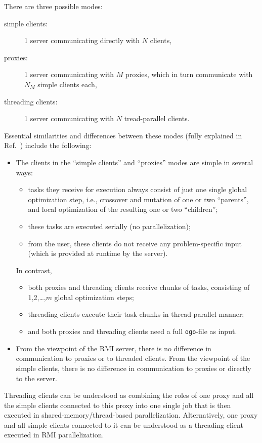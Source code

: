 \documentclass[a4paper,10pt]{scrbook}
\begin{document}
There are three possible modes: 
\begin{description}
\item[simple clients:] 1 server communicating directly with $N$ clients,
\item[proxies:] 1 server communicating with $M$ proxies, which in turn
  communicate with $N_M$ simple clients each,
\item[threading clients:] 1 server communicating with $N$ tread-parallel
  clients. 
\end{description}
Essential similarities and differences between these modes (fully explained in
Ref.~) include the following:
\begin{itemize}
\item The clients in the ``simple clients'' and ``proxies'' modes are simple
  in several ways:
  \begin{itemize}
  \item tasks they receive for execution always consist of just one single
    global optimization step, i.e., crossover and mutation of one or two
    ``parents'', and local optimization of the resulting one or two
    ``children'';
  \item these tasks are executed serially (no parallelization);
  \item from the user, these clients do not receive any problem-specific input
    (which is provided at runtime by the server).
  \end{itemize}
  In contrast, 
  \begin{itemize}
  \item both proxies and threading clients receive chunks of tasks, consisting
    of 1,2,\ldots,$m$ global optimization steps;
  \item threading clients execute their task chunks in thread-parallel manner;
  \item and both proxies and threading clients need a full \texttt{ogo}-file
    as input.
  \end{itemize}
\item From the viewpoint of the RMI server, there is no difference in
  communication to proxies or to threaded clients. From the viewpoint of the
  simple clients, there is no difference in communication to proxies or
  directly to the server. %
\end{itemize}
Threading clients can be understood as combining the roles of one proxy and
all the simple clients connected to this proxy into one single job that is
then executed in shared-memory/thread-based parallelization. Alternatively,
one proxy and all simple clients connected to it can be understood as a
threading client executed in RMI parallelization.
\end{document}
